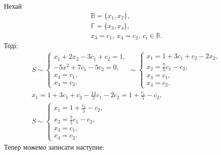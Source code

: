 Нехай
\begin{gather}
	\mathbb{B}=\{x_1,x_2\},\\
	\mathbb{F}=\{x_3,x_4\},\\
	x_3=c_1,\ x_4=c_2,\ c_i\in \mathbb{R}.
\end{gather}
Тоді:
\begin{gather}
	S\sim\begin{cases}
		x_1+2x_2-3c_1+c_2=1,\\
		-5x^2+7c_1-5c_2=0,\\
		x_3=c_1,\\
		x_4=c_2.
	\end{cases}\sim\begin{cases}
	x_1=1+3c_1+c_2-2x_2,\\
	x_2=\frac{7}{5}c_1-c_2,\\
	x_3=c_1,\\
	x_4=c_2.
\end{cases}\\
x_1=1+3c_1+c_2-\frac{14}{5}c_1-2c_2=1+\frac{c_1}{5}-c_2,\\
S\sim\begin{cases}
	x_1=1+\frac{c_1}{5}-c_2,\\
	x_2=\frac{7}{5}c_1-c_2,\\
	x_3=c_1,\\
	x_4=c_2.
\end{cases}
\end{gather}
Тепер можемо записати наступне:
